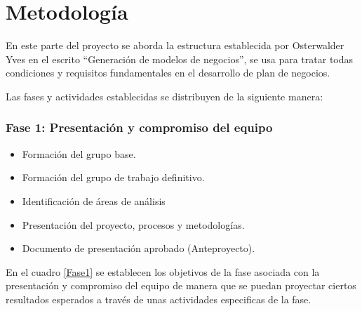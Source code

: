 
\section{Metodología}
En este parte del proyecto se aborda la estructura establecida por Osterwalder Yves en el escrito “Generación de modelos de negocios”\cite{modeloNegocio}, se usa para tratar todas condiciones y requisitos fundamentales en el desarrollo de plan de negocios. 

Las fases y actividades establecidas se distribuyen de la siguiente manera:
\subsubsection{Fase 1: Presentación y compromiso del equipo}


\begin{itemize}
    \item Formación del grupo base.
    \item Formación del grupo de trabajo definitivo.
    \item Identificación de áreas de análisis
    \item Presentación del proyecto, procesos y metodologías.
    \item Documento de presentación aprobado (Anteproyecto).
\end{itemize}

En el cuadro \ref{Fase1} se establecen los objetivos de la fase asociada con la presentación y compromiso del equipo de manera que se puedan proyectar ciertos resultados esperados a través de unas actividades especificas de la fase.

